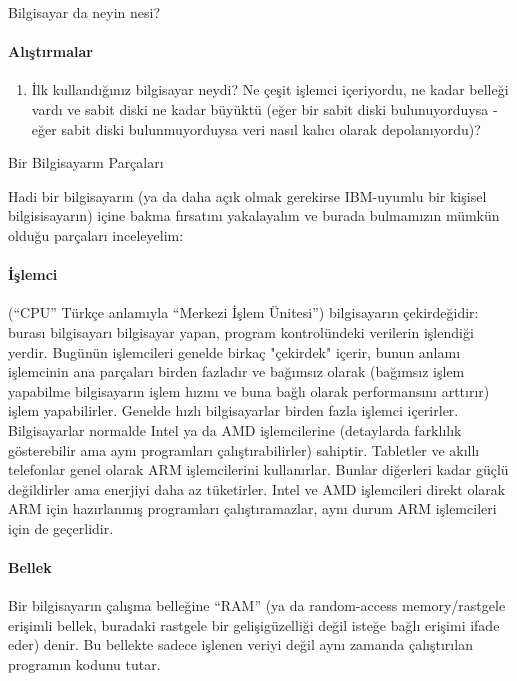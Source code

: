 \begin{section}{Bilgisayar da neyin nesi?}
\paragraph{{\Huge{\PencilLeftDown}}Alıştırmalar}{
\begin{enumerate}
 \item İlk kullandığınız bilgisayar neydi? Ne çeşit işlemci içeriyordu, ne kadar belleği vardı ve sabit diski ne kadar büyüktü (eğer bir sabit diski bulunuyorduysa - eğer sabit diski bulunmuyorduysa veri nasıl kalıcı olarak depolanıyordu)?
\end{enumerate}}

\end{section}

\begin{section}{Bir Bilgisayarın Parçaları}

Hadi bir bilgisayarın (ya da daha açık olmak gerekirse IBM-uyumlu bir kişisel bilgisisayarın) içine bakma fırsatını yakalayalım ve burada bulmamızın mümkün olduğu parçaları inceleyelim:
\paragraph{İşlemci}{(“CPU” Türkçe anlamıyla “Merkezi İşlem Ünitesi”) bilgisayarın çekirdeğidir: burası bilgisayarı bilgisayar yapan, program kontrolündeki verilerin işlendiği yerdir. Bugünün işlemcileri genelde birkaç "çekirdek" içerir, bunun anlamı işlemcinin ana parçaları birden fazladır ve bağımsız olarak (bağımsız işlem yapabilme bilgisayarın işlem hızını ve buna bağlı olarak performansını arttırır) işlem yapabilirler.  Genelde hızlı bilgisayarlar birden fazla işlemci içerirler. Bilgisayarlar normalde Intel ya da AMD işlemcilerine (detaylarda farklılık gösterebilir ama aynı programları çalıştırabilirler) sahiptir. Tabletler ve akıllı telefonlar genel olarak ARM işlemcilerini kullanırlar. Bunlar diğerleri kadar güçlü değildirler ama enerjiyi daha az tüketirler. Intel ve AMD işlemcileri direkt olarak ARM için hazırlanmış programları çalıştıramazlar, aynı durum ARM işlemcileri için de geçerlidir.}
\paragraph{Bellek}{Bir bilgisayarın çalışma belleğine “RAM” (ya da random-access memory/rastgele erişimli bellek, buradaki rastgele bir gelişigüzelliği değil isteğe bağlı erişimi ifade eder) denir. Bu bellekte sadece işlenen veriyi değil aynı zamanda çalıştırılan programın kodunu tutar.}


\end{section}
